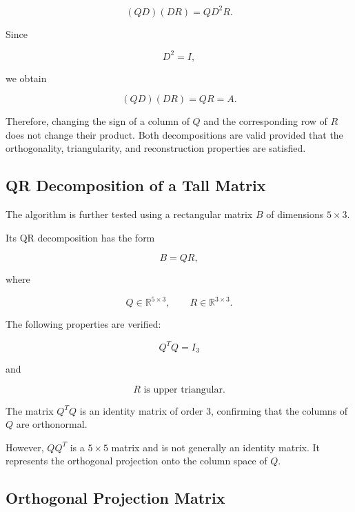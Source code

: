 \documentclass[12pt,a4paper]{article}
\numberwithin{equation}{section}
\begin{document}
\begin{equation}
(QD)(DR)=Q D^2 R.
\end{equation}

Since

\begin{equation}
D^2=I,
\end{equation}

we obtain

\begin{equation}
(QD)(DR)=QR=A.
\end{equation}

Therefore, changing the sign of a column of $Q$
and the corresponding row of $R$ does not change
their product. Both decompositions are valid
provided that the orthogonality, triangularity,
and reconstruction properties are satisfied.

\subsection{QR Decomposition of a Tall Matrix}

The algorithm is further tested using a rectangular
matrix $B$ of dimensions $5\times3$.

Its QR decomposition has the form

\begin{equation}
B=QR,
\end{equation}

where

\begin{equation}
Q\in\mathbb{R}^{5\times3},
\qquad
R\in\mathbb{R}^{3\times3}.
\end{equation}

The following properties are verified:

\begin{equation}
\boxed{Q^TQ=I_3}
\end{equation}

and

\begin{equation}
\boxed{R\text{ is upper triangular}}.
\end{equation}

The matrix $Q^TQ$ is an identity matrix of order
$3$, confirming that the columns of $Q$ are
orthonormal.

However, $QQ^T$ is a $5\times5$ matrix and
is not generally an identity matrix. It represents
the orthogonal projection onto the column space
of $Q$.

\subsection{Orthogonal Projection Matrix}
\end{document}
